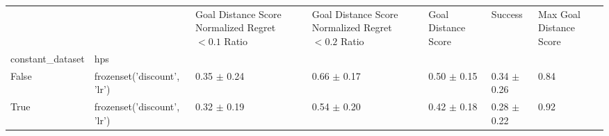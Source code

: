\begin{tabular}{lllllll}
\toprule
 &  & Goal Distance Score Normalized Regret $< 0.1$ Ratio & Goal Distance Score Normalized Regret $< 0.2$ Ratio & Goal Distance Score & Success & Max Goal Distance Score \\
constant_dataset & hps &  &  &  &  &  \\
\midrule
False & frozenset({'discount', 'lr'}) & 0.35 $\pm$ 0.24 & 0.66 $\pm$ 0.17 & 0.50 $\pm$ 0.15 & 0.34 $\pm$ 0.26 & 0.84 \\
\cline{1-7}
True & frozenset({'discount', 'lr'}) & 0.32 $\pm$ 0.19 & 0.54 $\pm$ 0.20 & 0.42 $\pm$ 0.18 & 0.28 $\pm$ 0.22 & 0.92 \\
\cline{1-7}
\bottomrule
\end{tabular}
